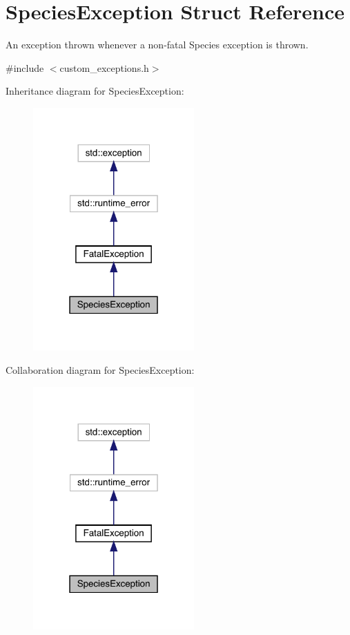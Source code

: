 \hypertarget{struct_species_exception}{}\section{Species\+Exception Struct Reference}
\label{struct_species_exception}


An exception thrown whenever a non-\/fatal Species exception is thrown.  




{\ttfamily \#include $<$custom\+\_\+exceptions.\+h$>$}



Inheritance diagram for Species\+Exception\+:
\nopagebreak
\begin{figure}[H]
\begin{center}
\leavevmode
\includegraphics[width=175pt]{struct_species_exception__inherit__graph}
\end{center}
\end{figure}


Collaboration diagram for Species\+Exception\+:
\nopagebreak
\begin{figure}[H]
\begin{center}
\leavevmode
\includegraphics[width=175pt]{struct_species_exception__coll__graph}
\end{center}
\end{figure}
